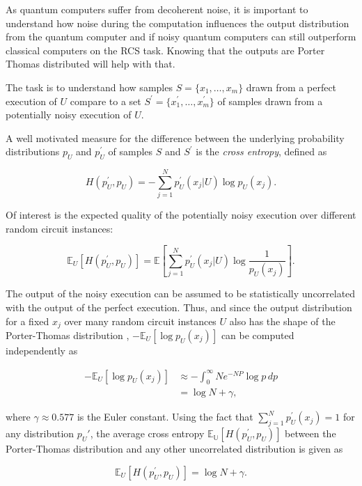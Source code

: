 As quantum computers suffer from decoherent noise, it is
important to understand how noise during the computation influences the output
distribution from the quantum computer and if noisy quantum computers can still
outperform classical computers on the RCS task. Knowing that the outputs are
Porter Thomas distributed will help with that.

The task is to understand how samples $S=\{x_1,\dots,x_m\}$ drawn from a perfect execution of
$U$ compare to a set $S^{\prime}=\{x_1^{\prime},\dots,x_m^{\prime}\}$ of samples drawn from a potentially noisy
execution of $U$.

A well motivated measure for the difference between the underlying
probability distributions $p_U$ and $p_U^{\prime}$ of samples $S$ and $S^{\prime}$ is the \textit{cross entropy}, defined as


\begin{equation}
  H(p_U^{\prime},p_U) = - \sum_{j=1}^Np_U^{\prime}(x_j|U) \log{p_U(x_j)}.
\end{equation}

Of interest is the expected quality of the potentially noisy execution over
different random circuit instances:

\begin{equation}
  \mathbb{E}_U[H(p_U^{\prime},p_U)] = \mathbb{E} \left[\sum_{j=1}^Np_U^{\prime}(x_j|U)\log{\frac{1}{p_U(x_j)}}\right].
\end{equation}

The output of the noisy execution can be assumed to
be statistically uncorrelated with the output of the perfect execution. Thus,
and since the output distribution for a fixed $x_j$ over many random circuit
instances $U$ also has the shape of the Porter-Thomas distribution \cite{harrow2008random},
$-\mathbb{E}_U[\log{p_U(x_j)}]$ can be computed independently as

\begin{align}
  -\mathbb{E}_U[\log{p_U(x_j)}] &\approx - \int_0^{\infty}Ne^{-NP}\log{p} \,dp \\
                                &= \log{N} + \gamma,
\end{align}

where $\gamma \approx 0.577$ is the Euler constant.
Using the fact that $\sum_{j=1}^Np_U^{\prime}(x_j) = 1$ for any distribution $p_U{\prime}$, the average cross
entropy $\mathbb{E_U}[H(p_U^{\prime},p_U)]$ between the Porter-Thomas distribution and any other uncorrelated distribution is
given as 

\begin{equation}
  \mathbb{E}_U [H(p_U^{\prime},p_U)] = \log{N} + \gamma.
\end{equation}

